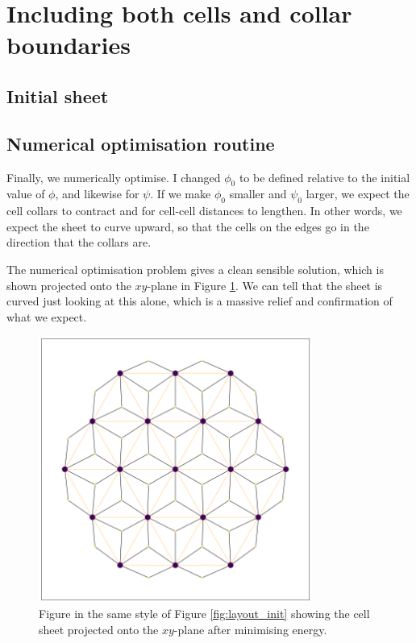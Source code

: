 
\section{Including both cells and collar boundaries}

\subsection{Initial sheet}

\subsection{Numerical optimisation routine} \label{subsec:numerical}

Finally, we numerically optimise. I changed $\phi_0$ to be defined relative to the initial value of $\phi$, and likewise for $\psi$. If we make $\phi_0$ smaller and $\psi_0$ larger, we expect the cell collars to contract and for cell-cell distances to lengthen. In other words, we expect the sheet to curve upward, so that the cells on the edges go in the direction that the collars are.

The numerical optimisation problem gives a clean sensible solution, which is shown projected onto the $xy$-plane in Figure \ref{fig:layout_curved}. We can tell that the sheet is curved just looking at this alone, which is a massive relief and confirmation of what we expect.

\begin{figure}[htbp]
    \centering
    \includegraphics[width=0.8\textwidth]{layout_curved.png}
    \caption{Figure in the same style of Figure \ref{fig:layout_init} showing the cell sheet projected onto the $xy$-plane after minimising energy. }
    \label{fig:layout_curved}
\end{figure}

